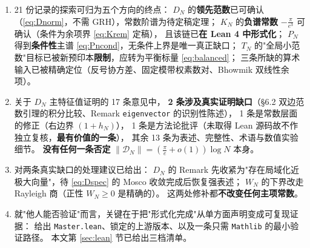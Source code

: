 \documentclass[11pt,a4paper]{ctexart}
\begin{document}
\begin{enumerate}[label=(\roman*),leftmargin=2.4em]
\item 21 份记录的探索可归为五个方向的终点：
$D_N$ 的\textbf{领先范数}已可确认（\eqref{eq:Dnorm}，不需 GRH），常数阶谱为待定稿定理；
$K_N$ 的\textbf{负谱常数} $-\frac{\pi}{e^3}$ 可确认（条件为余项界 \eqref{eq:Krem} 定稿），
且该链已\textbf{在 Lean 4 中形式化}；
$P_N$ 得到\textbf{条件性}主谱 \eqref{eq:Pncond}，无条件上界是唯一真正缺口；
$T_N$ 的"全局小范数"目标已被新预印本\textbf{限制}，应转为平衡标量 \eqref{eq:balanced}；
三条所缺的算术输入已被精确定位（反号协方差、固定模带权素数对、Bhowmik 双线性余项）。

\item 关于 $D_N$ 主特征值证明的 17 条意见中，
\textbf{2 条涉及真实证明缺口}（\S6.2 双边范数引理的积分比较、Remark \texttt{eigenvector} 的识别性陈述），
1 条是常数层面的修正（右边界 $(1+h_N)$），
1 条是方法论批评（未取得 Lean 源码故不作独立复核，\textbf{最有价值的一条}），
其余 13 条为表述、完整性、术语与数值实验细节。
\textbf{没有任何一条否定} $\|\mathcal D_N\|=(\frac{\pi}{e}+o(1))\log N$ 本身。

\item 对两条真实缺口的处理建议已给出：
$D_N$ 的 Remark 先收紧为"存在局域化近极大向量"，待 \eqref{eq:Dspec} 的 Mosco 收敛完成后恢复强表述；
$W_N$ 的下界改走 Rayleigh 商（正性 $W_N\ge0$ 是精确的）。
这两处修补都\textbf{不改变任何主项常数}。

\item 就"他人能否验证"而言，关键在于把"形式化完成"从单方面声明变成可复现证据：
给出 \texttt{Master.lean}、锁定的上游版本、以及一条只需 \texttt{Mathlib} 的最小验证路径。
本文第 \ref{sec:lean} 节已给出三档清单。
\end{enumerate}
\end{document}
